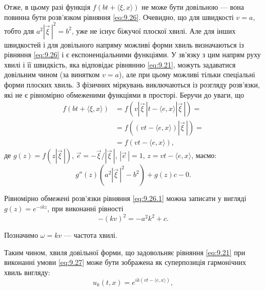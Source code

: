 Отже, в цьому разі функція $f(b t + \langle \xi, x \rangle)$ не може бути довільною --- вона повинна бути розв'язком рівняння \eqref{eq:9.26}. Очевидно, що для швидкості $v = a$, тобто для $a^2 \left| \vec \xi \, \right|^2 = b^2$, уже не існує біжучої плоскої хвилі. Але для інших швидкостей і для довільного напряму можливі форми хвиль визначаються із рівняння \eqref{eq:9.26} і є експоненціальними функціями. У зв'язку з цим напрям руху хвилі і її швидкість, яка відповідає рівнянню \eqref{eq:9.21}, можуть задаватися довільним чином (за винятком $v = a$), але при цьому можливі тільки спеціальні форми плоских хвиль. З фізичних міркувань виключаються із розгляду розв'язки, які не є рівномірно обмеженими функціями в просторі. Беручи до уваги, що
\begin{equation}
    \begin{aligned}
        f(b t + \langle \xi, x \rangle) &= f \left( v \left| \vec \xi \, \right| t - \langle e, x \rangle \left| \vec \xi \, \right| \right) = \\
        &= f \left( (v t - \langle e, x \rangle ) \left| \vec \xi \, \right| \right) = \\
        &= f (v t - \langle e, x \rangle),
    \end{aligned}
\end{equation}
де $g(z) = f \left( z \left| \vec \xi \, \right| \right)$, $\vec e = - \vec \xi / \left| \vec \xi \, \right|$, $\left| \vec e \, \right| = 1$, $z = v t - \langle e, x \rangle$, маємо:
\begin{equation}
    \label{eq:9.26.1}
    g''(z) \left( a^2 \left| \vec \xi \, \right|^2 - b^2 \right) + g(z) c - 0.
\end{equation}

Рівномірно обмежені розв'язки рівняння \eqref{eq:9.26.1} можна записати у вигляді $g(z) = e^{-ikz}$, при виконанні рівності
\begin{equation}
    \label{eq:9.27}
    - (k v)^2 = - a^2 k^2 + c.
\end{equation}

Позначимо $\omega = kv$ --- частота хвилі. \medskip

Таким чином, хвиля довільної форми, що задовольняє рівняння \eqref{eq:9.21} при виконанні умови \eqref{eq:9.27} може бути зображена як суперпозиція гармонічних хвиль вигляду:
\begin{equation}
    \label{eq:9.28}
    u_k(t, x) = e^{i k (v t - \langle e, x \rangle)},
\end{equation}


